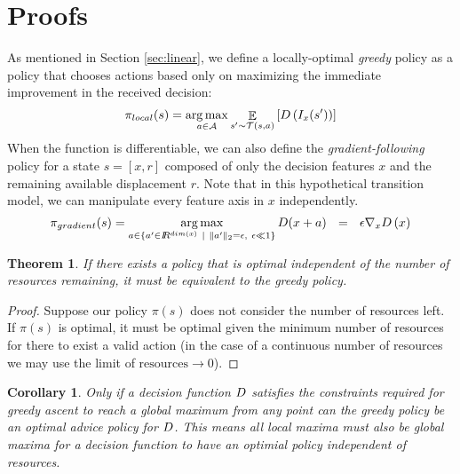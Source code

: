 \section{Proofs}
\label{sec:proofs}

\newtheorem{atheorem}{Theorem}
\newtheorem{acorollary}{Corollary}[atheorem]
\setcounter{atheorem}{0}

As mentioned in Section \ref{sec:linear}, we define a locally-optimal \textit{greedy} policy as a policy that chooses actions based only on maximizing the immediate improvement in the received decision:
\begin{equation*}
\pi_{local}(s) = \operatorname*{arg\,max}_{a \in \mathcal{A}} \mathop{\mathbb{E}}_{s' \sim \mathcal{T}(s,a)} \left [D\left(I_x(s')\right)\right ]
\end{equation*}
When the function is differentiable, we can also define the \textit{gradient-following} policy for a state $s = [x, r]$ composed of only the decision features $x$ and the remaining available displacement $r$. Note that in this hypothetical transition model, we can manipulate every feature axis in $x$ independently.
\begin{equation*}
\pi_{gradient}(s) = \operatorname*{arg\,max}_{a \in\{a' \in I\!\!R^{dim(x)}~| ~\|a'\|_2 = \epsilon, ~\epsilon \ll 1\} } D(x + a) ~~= ~~ \epsilon \nabla_xD\left(x\right)
\end{equation*}

\begin{atheorem}
If there exists a policy that is optimal independent of the number of resources remaining, it must be equivalent to the greedy policy.
\end{atheorem}
\begin{proof}
Suppose our policy $\pi(s)$ does not consider the number of resources left. If $\pi(s)$ is optimal, it must be optimal given the minimum number of resources for there to exist a valid action (in the case of a continuous number of resources we may use the limit of $\text{resources} \rightarrow 0$).
\end{proof}

\begin{acorollary}
Only if a decision function $D$ satisfies the constraints required for greedy ascent to reach a global maximum from any point can the greedy policy be an optimal advice policy for $D$. This means all local maxima must also be global maxima for a decision function to have an optimial policy independent of resources.


\end{acorollary}

